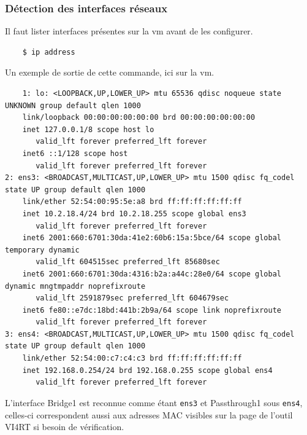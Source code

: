 \documentclass[a4paper]{article}
\begin{document}
\subsubsection{Détection des interfaces réseaux}
\label{sec:secip}
\label{sec:sec02}
Il faut lister interfaces présentes sur la \acrshort{vm} avant de les configurer.\\
\begin{lstlisting}
    $ ip address
\end{lstlisting}
Un exemple de sortie de cette commande, ici sur la \acrshort{vm}.
\begin{lstlisting}    
    1: lo: <LOOPBACK,UP,LOWER_UP> mtu 65536 qdisc noqueue state UNKNOWN group default qlen 1000
    link/loopback 00:00:00:00:00:00 brd 00:00:00:00:00:00
    inet 127.0.0.1/8 scope host lo
       valid_lft forever preferred_lft forever
    inet6 ::1/128 scope host 
       valid_lft forever preferred_lft forever
2: ens3: <BROADCAST,MULTICAST,UP,LOWER_UP> mtu 1500 qdisc fq_codel state UP group default qlen 1000
    link/ether 52:54:00:95:5e:a8 brd ff:ff:ff:ff:ff:ff
    inet 10.2.18.4/24 brd 10.2.18.255 scope global ens3
       valid_lft forever preferred_lft forever
    inet6 2001:660:6701:30da:41e2:60b6:15a:5bce/64 scope global temporary dynamic 
       valid_lft 604515sec preferred_lft 85680sec
    inet6 2001:660:6701:30da:4316:b2a:a44c:28e0/64 scope global dynamic mngtmpaddr noprefixroute 
       valid_lft 2591879sec preferred_lft 604679sec
    inet6 fe80::e7dc:18bd:441b:2b9a/64 scope link noprefixroute 
       valid_lft forever preferred_lft forever
3: ens4: <BROADCAST,MULTICAST,UP,LOWER_UP> mtu 1500 qdisc fq_codel state UP group default qlen 1000
    link/ether 52:54:00:c7:c4:c3 brd ff:ff:ff:ff:ff:ff
    inet 192.168.0.254/24 brd 192.168.0.255 scope global ens4
       valid_lft forever preferred_lft forever
\end{lstlisting}
L'interface Bridge1 est reconnue comme étant \verb|ens3| et Passthrough1 sous \verb|ens4|, celles-ci correspondent aussi aux adresses MAC visibles sur la page de l'outil VI4RT si besoin de vérification.
\end{document}
